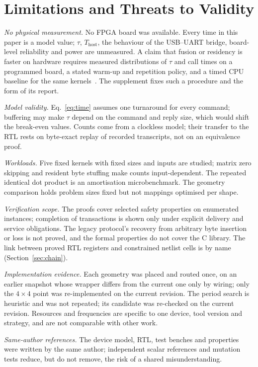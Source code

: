 \section{Limitations and Threats to Validity}
\label{sec:limits}

\emph{No physical measurement.} No FPGA board was available. Every time in
this paper is a model value; $\tau$, $T_{\mathrm{host}}$, the behaviour of
the USB--UART bridge, board-level reliability and power are unmeasured. A
claim that fusion or residency is faster on hardware requires measured
distributions of $\tau$ and call times on a programmed board, a stated
warm-up and repetition policy, and a timed CPU baseline for the same
kernels~\cite{hoefler-benchmarking}. The supplement fixes such a procedure
and the form of its report.

\emph{Model validity.} Eq.~\eqref{eq:time} assumes one turnaround for every
command; buffering may make $\tau$ depend on the command and reply size,
which would shift the break-even values. Counts come from a clockless model;
their transfer to the RTL rests on byte-exact replay of recorded transcripts,
not on an equivalence proof.

\emph{Workloads.} Five fixed kernels with fixed sizes and inputs are
studied; matrix zero skipping and resident byte stuffing make counts
input-dependent. The repeated identical dot product is an amortisation
microbenchmark. The geometry comparison holds problem sizes fixed but not
mappings optimised per shape.

\emph{Verification scope.} The proofs cover selected safety properties on
enumerated instances; completion of transactions is shown only under
explicit delivery and service obligations. The legacy protocol's recovery
from arbitrary byte insertion or loss is not proved, and the formal
properties do not cover the C library. The link between proved RTL
registers and constrained netlist cells is by name (Section~\ref{sec:chain}).

\emph{Implementation evidence.} Each geometry was placed and routed once,
on an earlier snapshot whose wrapper differs from the current one only by
wiring; only the $4\times4$ point was re-implemented on the current
revision. The period search is heuristic and was not repeated; its candidate
was re-checked on the current revision.
Resources and frequencies are specific to one device, tool version and
strategy, and are not comparable with other work.

\emph{Same-author references.} The device model, RTL, test benches and
properties were written by the same author; independent scalar references
and mutation tests reduce, but do not remove, the risk of a shared
misunderstanding.
